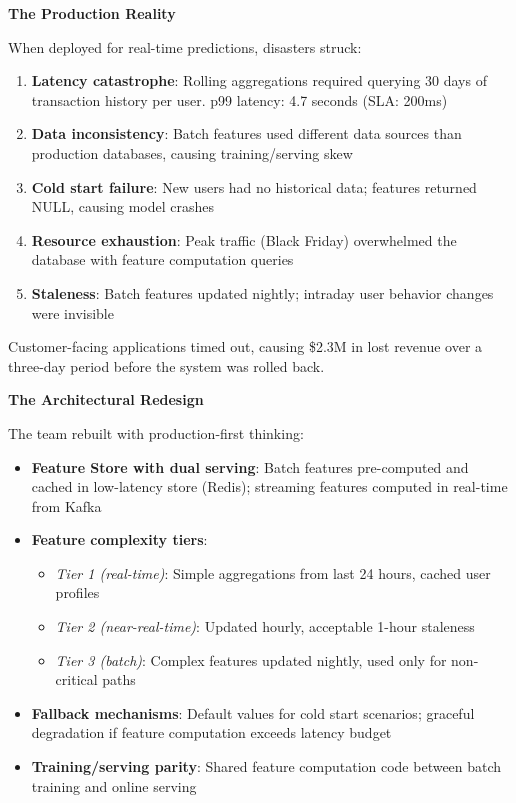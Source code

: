 \textbf{The Production Reality}

When deployed for real-time predictions, disasters struck:
\begin{enumerate}
    \item \textbf{Latency catastrophe}: Rolling aggregations required querying 30 days of transaction history per user. p99 latency: 4.7 seconds (SLA: 200ms)
    \item \textbf{Data inconsistency}: Batch features used different data sources than production databases, causing training/serving skew
    \item \textbf{Cold start failure}: New users had no historical data; features returned NULL, causing model crashes
    \item \textbf{Resource exhaustion}: Peak traffic (Black Friday) overwhelmed the database with feature computation queries
    \item \textbf{Staleness}: Batch features updated nightly; intraday user behavior changes were invisible
\end{enumerate}

Customer-facing applications timed out, causing \$2.3M in lost revenue over a three-day period before the system was rolled back.

\textbf{The Architectural Redesign}

The team rebuilt with production-first thinking:
\begin{itemize}
    \item \textbf{Feature Store with dual serving}: Batch features pre-computed and cached in low-latency store (Redis); streaming features computed in real-time from Kafka
    \item \textbf{Feature complexity tiers}:
    \begin{itemize}
        \item \textit{Tier 1 (real-time)}: Simple aggregations from last 24 hours, cached user profiles
        \item \textit{Tier 2 (near-real-time)}: Updated hourly, acceptable 1-hour staleness
        \item \textit{Tier 3 (batch)}: Complex features updated nightly, used only for non-critical paths
    \end{itemize}
    \item \textbf{Fallback mechanisms}: Default values for cold start scenarios; graceful degradation if feature computation exceeds latency budget
    \item \textbf{Training/serving parity}: Shared feature computation code between batch training and online serving
\end{itemize}

